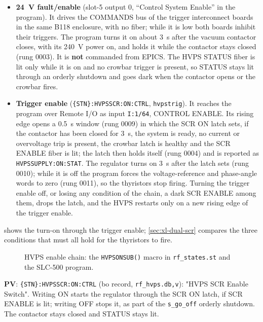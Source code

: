 \begin{itemize}
\tightlist
\item
  \textbf{24~V fault/enable} (slot-5 output 0, ``Control System Enable'' in the program). It drives the COMMANDS bus of the trigger interconnect boards in the same B118 enclosure, with no fiber; while it is low both boards inhibit their triggers. The program turns it on about \qty{3}{\second} after the vacuum contactor closes, with its 240~V power on, and holds it while the contactor stays closed (rung 0003). It is \textbf{not} commanded from EPICS. The HVPS STATUS fiber is lit only while it is on and no crowbar trigger is present, so STATUS stays lit through an orderly shutdown and goes dark when the contactor opens or the crowbar fires.
\item
  \textbf{Trigger enable} (\texttt{\{STN\}:\allowbreak{}HVPSSCR:\allowbreak{}ON:\allowbreak{}CTRL}, \texttt{hvpstrig}). It reaches the program over Remote I/O as input \texttt{I:1/64}, CONTROL ENABLE. Its rising edge opens a \qty{0.5}{\second} window (rung 0009) in which the SCR ON latch sets, if the contactor has been closed for \qty{3}{\second}, the system is ready, no current or overvoltage trip is present, the crowbar latch is healthy and the SCR ENABLE fiber is lit; the latch then holds itself (rung 0004) and is reported as \texttt{HVPSSUPPLY:\allowbreak{}ON:\allowbreak{}STAT}. The regulator turns on \qty{3}{\second} after the latch sets (rung 0010); while it is off the program forces the voltage-reference and phase-angle words to zero (rung 0011), so the thyristors stop firing. Turning the trigger enable off, or losing any condition of the chain, a dark SCR ENABLE among them, drops the latch, and the HVPS restarts only on a new rising edge of the trigger enable.
\end{itemize}

 shows the turn-on through the trigger enable; \cref{sec:xl-dual-scr} compares the three conditions that must all hold for the thyristors to fire.

\begin{figure}[tbp]
\centering
\begin{fitpicture}\end{fitpicture}
\caption{HVPS enable chain: the \texttt{HVPSONSUB()} macro in \texttt{rf\_states.st} and the SLC-500 program.}\label{fig:hvps-enable-chain}
\end{figure}

\begin{keynote}
\textbf{PV}: \texttt{\{STN\}:\allowbreak{}HVPSSCR:\allowbreak{}ON:\allowbreak{}CTRL} (bo record, \texttt{rf\_hvps.db,v}): "HVPS SCR Enable Switch". Writing ON starts the regulator through the SCR ON latch, if SCR ENABLE is lit; writing OFF stops it, as part of the \texttt{s\_go\_off} orderly shutdown. The contactor stays closed and STATUS stays lit.
\end{keynote}

